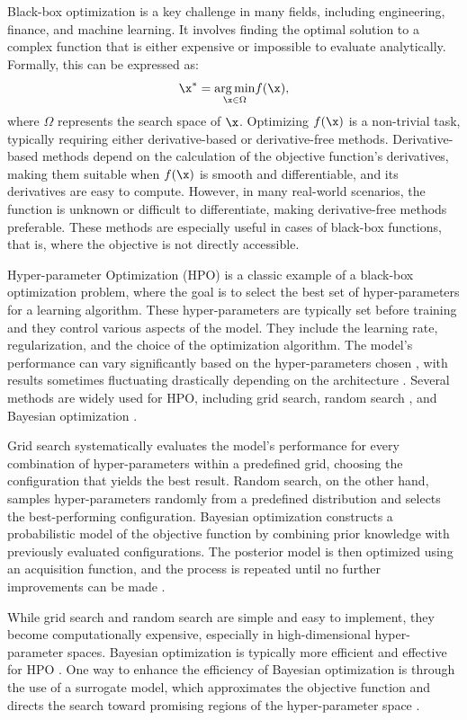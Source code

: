 \documentclass [PhD] {package/uclathes}
\begin{document}
Black-box optimization is a key challenge in many fields, including engineering, finance, and machine learning. It involves finding the optimal solution to a complex function that is either expensive or impossible to evaluate analytically. Formally, this can be expressed as:
$$
\x^* = \underset{\x \in \Omega}{\arg \min} f(\x),
$$
where \(\Omega\) represents the search space of \(\x\). Optimizing \(f(\x)\) is a non-trivial task, typically requiring either derivative-based or derivative-free methods. Derivative-based methods depend on the calculation of the objective function's derivatives, making them suitable when \(f(\x)\) is smooth and differentiable, and its derivatives are easy to compute. However, in many real-world scenarios, the function is unknown or difficult to differentiate, making derivative-free methods preferable. These methods are especially useful in cases of black-box functions, that is, where the objective is not directly accessible.

Hyper-parameter Optimization (HPO) is a classic example of a black-box optimization problem, where the goal is to select the best set of hyper-parameters for a learning algorithm. These hyper-parameters are typically set before training and they control various aspects of the model. They include the learning rate, regularization, and the choice of the optimization algorithm. The model's performance can vary significantly based on the hyper-parameters chosen \parencite{feurer2019hyperparameter}, with results sometimes fluctuating drastically depending on the architecture \parencite{liu2018darts}. Several methods are widely used for HPO, including grid search, random search \parencite{bergstra2012random}, and Bayesian optimization \parencite{pelikan1999boa}.

Grid search systematically evaluates the model's performance for every combination of hyper-parameters within a predefined grid, choosing the configuration that yields the best result. Random search, on the other hand, samples hyper-parameters randomly from a predefined distribution and selects the best-performing configuration. Bayesian optimization constructs a probabilistic model of the objective function by combining prior knowledge with previously evaluated configurations. The posterior model is then optimized using an acquisition function, and the process is repeated until no further improvements can be made \parencite{brochu2010tutorial}.

While grid search and random search are simple and easy to implement, they become computationally expensive, especially in high-dimensional hyper-parameter spaces. Bayesian optimization is typically more efficient and effective for HPO \parencite{snoek2012practical}. One way to enhance the efficiency of Bayesian optimization is through the use of a surrogate model, which approximates the objective function and directs the search toward promising regions of the hyper-parameter space \parencite{jones1998efficient}.
\end{document}
